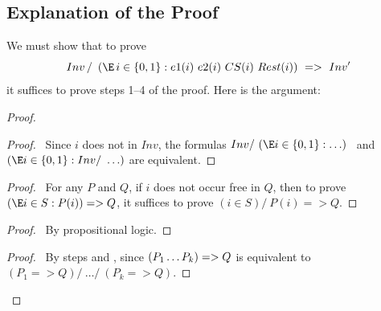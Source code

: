 \documentclass[fleqn,leqno]{article}
\begin{document}
\subsection*{Explanation of the Proof}

We must show that to prove
 \[ Inv \,/\ \, (\E\, i \in \{0,1\} : e1(i) 
            \,\/\, e2(i) \,\/\, CS(i) \,\/\, Rest(i))
      \ => \ Inv'\]
it suffices to prove steps 1--4 of the proof.  Here is the argument:
\begin{proof}
\pflongnumbers
\pflongindent

\vspace{.42em}
\begin{proof}
\pf\ Since $i$ does not  in $Inv$,
the formulas 
$Inv /\ (\E i \in \{0,1\} : \ldots)$ \ and \
$(\E i \in \{0,1\} : Inv /\ \ldots)$ 
are equivalent.
\end{proof}

\vspace{.61em}

\vspace{.42em}
\begin{proof}
\pf\ For any $P$ and $Q$, if $i$ does not occur free in $Q$, then to
prove $(\E i \in S : P(i)) => Q$, it suffices to prove 
 $(i \in S) /\ P(i) => Q$.
\end{proof}

\vspace{.61em}

\vspace{.42em}
\begin{proof}
\pf\ By propositional logic.
\end{proof}

\vspace{.61em}

\qedstep
\vspace{.42em}
\begin{proof}
\pf\ By steps  and , since 
  $(P_{1} \/ \ldots \/ P_{k}) => Q$ is equivalent to\\
  $(P_{1} => Q) /\ \ldots /\ (P_{k}=>Q)$.
\end{proof}
\end{proof}
\end{document}
